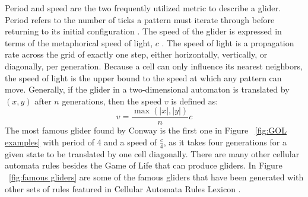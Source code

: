\documentclass[12pt]{article}
\numberwithin{figure}{section} %
\begin{document}
Period and speed are the two frequently utilized metric to describe a glider. Period refers to the number of ticks a pattern must iterate through before returning to its initial configuration \cite{The Game of Life}. The speed of the glider is expressed in terms of the metaphorical speed of light, $c$ \cite{spaceship, speed of light}. The speed of light is a propagation rate across the grid of exactly one step, either horizontally, vertically, or diagonally, per generation. Because a cell can only influence its nearest neighbors, the speed of light is the upper bound to the speed at which any pattern can move. Generally, if the glider in a two-dimensional automaton is translated by $(x,y)$ after $n$ generations, then the speed $v$ is defined as: 
$$v = \frac{\max(|x|, |y|)}{n}c$$
The most famous glider found by Conway is the first one in Figure ~\ref{fig:GOL examples} with period of 4 and a speed of $\frac{c}{4}$, as it takes four generations for a given state to be translated by one cell diagonally. There are many other cellular automata rules besides the Game of Life that can produce gliders. In Figure ~\ref{fig:famous gliders} are some of the famous gliders that have been generated with other sets of rules featured in Cellular Automata Rules Lexicon \cite{Lexicon}. 
\end{document}
